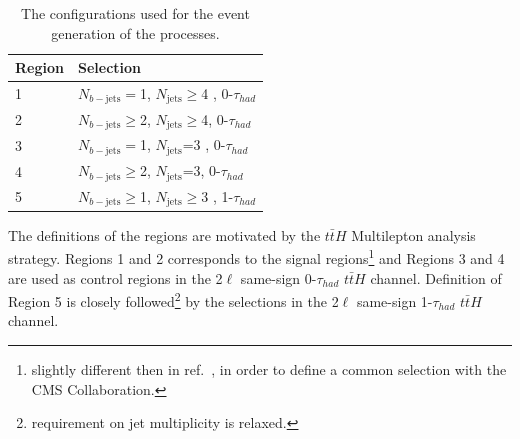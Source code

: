 \begin{table}
\begin{center}
\caption{\label{tab:ttWregions}
The configurations used for the event generation of the \ttW processes.}
\vspace{0.25cm}
{\small
\setlength\tabcolsep{1.5pt}
\begin{tabular}{l|l}
\hline\hline
Region & Selection  \\
\hline
1  & $N_{b-\mathrm{jets}}=$1, $N_{\mathrm{jets}}\geq$4 , 0-$\tau_{had}$ \\
2 & $N_{b-\mathrm{jets}}\geq$2,   $N_{\mathrm{jets}}\geq$4, 0-$\tau_{had}$ \\
3 & $N_{b-\mathrm{jets}}=$1,  $N_{\mathrm{jets}}$=3 , 0-$\tau_{had}$ \\
4 & $N_{b-\mathrm{jets}}\geq$2, $N_{\mathrm{jets}}$=3, 0-$\tau_{had}$ \\
5 & $N_{b-\mathrm{jets}}\geq$1, $N_{\mathrm{jets}}\geq$3 , 1-$\tau_{had}$\\

\hline
\hline
\end{tabular}
}
\end{center}
\end{table}

The definitions of the regions are motivated by the $t\bar{t}H$ Multilepton analysis strategy.
Regions 1 and 2 corresponds to the signal regions\footnote{slightly different then in ref.~\cite{ATLAS-CONF-2019-045}, in order to define a common selection with the CMS Collaboration.} and Regions 3 and 4 are used as control regions in the 2$\ell$ same-sign  0-$\tau_{had}$ $t\bar{t}H$ channel.
Definition of Region 5 is closely followed\footnote{requirement on jet multiplicity is relaxed.} by the selections in the 2$\ell$ same-sign 1-$\tau_{had}$ $t\bar{t}H$ channel.





